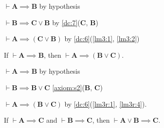 \documentclass{amsart}%
\newcommand\metavariable[1]{\boldsymbol{#1}}
\begin{document}
\begin{pf}
\item\label{lm3:1} $\vdash\metavariable{A}\implies\metavariable{B}$ by hypothesis
\item\label{lm3:2} $\vdash\metavariable{B}\implies\metavariable{C}\lor\metavariable{B}$ 
  by \ref{dc:7}($\metavariable{C}$, $\metavariable{B}$)
\item $\vdash\metavariable{A}\implies(\metavariable{C}\lor\metavariable{B})$
  by \ref{dc:6}(\ref{lm3:1}, \ref{lm3:2})
\end{pf}

\begin{lemma}\label{lem:prop:weakening-r}
If $\vdash\metavariable{A}\implies\metavariable{B}$, then $\vdash\metavariable{A}\implies(\metavariable{B}\lor\metavariable{C})$.
\end{lemma}

\begin{pf}
\item\label{lm3r:1} $\vdash\metavariable{A}\implies\metavariable{B}$ by hypothesis
\item\label{lm3r:4} $\vdash\metavariable{B}\implies\metavariable{B}\lor\metavariable{C}$
  \ref{axiom:s2}($\metavariable{B}$, $\metavariable{C}$)
\item $\vdash\metavariable{A}\implies(\metavariable{B}\lor\metavariable{C})$
  by \ref{dc:6}(\ref{lm3r:1}, \ref{lm3r:4}).
\end{pf}

\begin{lemma}\label{lm:prop:weaken-premises}
If $\vdash\metavariable{A}\implies\metavariable{C}$
and $\vdash\metavariable{B}\implies\metavariable{C}$,
then $\vdash\metavariable{A}\lor\metavariable{B}\implies\metavariable{C}$.
\end{lemma}
\end{document}
